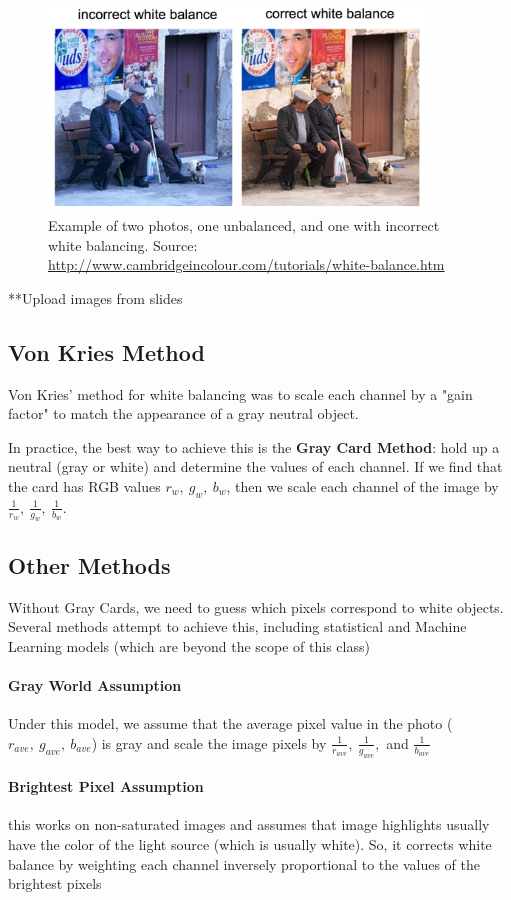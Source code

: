 \documentclass{article}
\begin{document}
\begin{figure}[h!]
\centering
\includegraphics[width=10cm]{wb.png}
\caption{Example of two photos, one unbalanced, and one with incorrect white balancing.  Source: \url{http://www.cambridgeincolour.com/tutorials/white-balance.htm}}
\end{figure}


**Upload images from slides
\subsection{Von Kries Method}
Von Kries' method for white balancing was to scale each channel by a "gain factor" to match the appearance of a gray neutral object.

In practice, the best way to achieve this is the \textbf{Gray Card Method}: hold up a neutral (gray or white) and determine the values of each channel.  If we find that the card has RGB values $r_w,\ g_w,\ b_w$, then we scale each channel of the image by $\frac{1}{r_w},\ \frac{1}{g_w},\ \frac{1}{b_w}$.

\subsection{Other Methods}
Without Gray Cards, we need to guess which pixels correspond to white objects.  Several methods attempt to achieve this, including statistical and Machine Learning models (which are beyond the scope of this class)

\paragraph{Gray World Assumption} Under this model, we assume that the average pixel value in the photo ($r_{ave},\ g_{ave},\ b_{ave}$) is gray and scale the image pixels by $\frac{1}{r_{ave}},\ \frac{1}{g_{ave}},$ and $\frac{1}{b_{ave}}$

\paragraph{Brightest Pixel Assumption} this works on non-saturated images and assumes that image highlights usually have the color of the light source (which is usually white).  So, it corrects white balance by weighting each channel inversely proportional to the values of the brightest pixels
\end{document}
